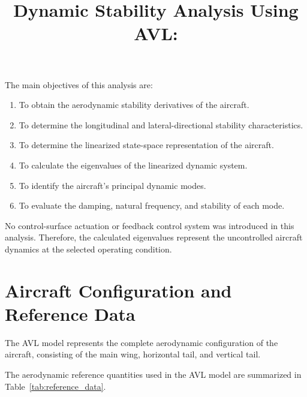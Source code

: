 \documentclass[11pt,a4paper]{article}
\begin{document}
\title{Dynamic Stability Analysis Using AVL:}


The main objectives of this analysis are:

\begin{enumerate}
    \item To obtain the aerodynamic stability derivatives of the aircraft.
    \item To determine the longitudinal and lateral-directional stability
    characteristics.
    \item To determine the linearized state-space representation of the
    aircraft.
    \item To calculate the eigenvalues of the linearized dynamic system.
    \item To identify the aircraft's principal dynamic modes.
    \item To evaluate the damping, natural frequency, and stability of each
    mode.
\end{enumerate}

No control-surface actuation or feedback control system was introduced in
this analysis. Therefore, the calculated eigenvalues represent the
uncontrolled aircraft dynamics at the selected operating condition.

\section{Aircraft Configuration and Reference Data}

The AVL model represents the complete aerodynamic configuration of the
aircraft, consisting of the main wing, horizontal tail, and vertical tail.

The aerodynamic reference quantities used in the AVL model are summarized
in Table~\ref{tab:reference_data}.
\end{document}
